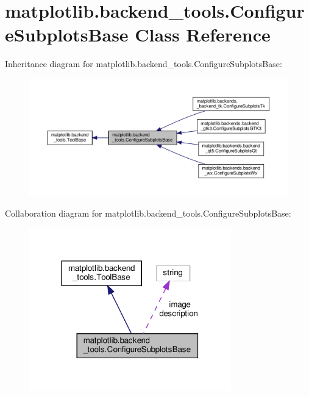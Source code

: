 \hypertarget{classmatplotlib_1_1backend__tools_1_1ConfigureSubplotsBase}{}\section{matplotlib.\+backend\+\_\+tools.\+Configure\+Subplots\+Base Class Reference}
\label{classmatplotlib_1_1backend__tools_1_1ConfigureSubplotsBase}


Inheritance diagram for matplotlib.\+backend\+\_\+tools.\+Configure\+Subplots\+Base\+:
\nopagebreak
\begin{figure}[H]
\begin{center}
\leavevmode
\includegraphics[width=350pt]{classmatplotlib_1_1backend__tools_1_1ConfigureSubplotsBase__inherit__graph}
\end{center}
\end{figure}


Collaboration diagram for matplotlib.\+backend\+\_\+tools.\+Configure\+Subplots\+Base\+:
\nopagebreak
\begin{figure}[H]
\begin{center}
\leavevmode
\includegraphics[width=248pt]{classmatplotlib_1_1backend__tools_1_1ConfigureSubplotsBase__coll__graph}
\end{center}
\end{figure}
